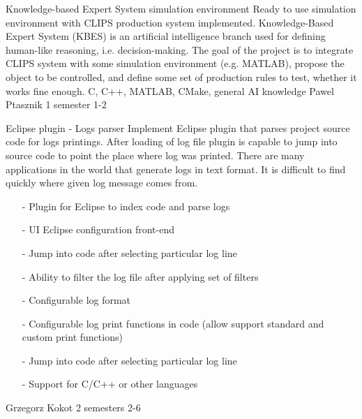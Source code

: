 \begin{project}
{Knowledge-based Expert System simulation environment}
{Ready to use simulation environment with CLIPS production system implemented.}
{
Knowledge-Based Expert System (KBES) is an artificial intelligence branch used for defining human-like reasoning, i.e. decision-making. The goal of the project is to integrate CLIPS system with some simulation environment (e.g. MATLAB), propose the object to be controlled, and define some set of production rules to test, whether it works fine enough. }
{C, C++, MATLAB, CMake, general AI knowledge}
{Pawel Ptasznik}
{1 semester}
{1-2}
\end{project}
\begin{project}
{Eclipse plugin - Logs parser}
{
Implement Eclipse plugin that parses project source code for logs printings.
After loading of log file plugin is capable to jump into source code to point
the place where log was printed.
There are many applications in the world that generate logs in text format. It is difficult to find quickly where given log message comes from. 
}
{
 \begin{itemize}
  \item[-] Plugin for Eclipse to index code and parse logs
  \item[-] UI Eclipse configuration front-end
  \item[-] Jump into code after selecting particular log line
  \item[-] Ability to filter the log file after applying set of filters
\end{itemize}
}
{
 \begin{itemize}
  \item[-] Configurable log format
  \item[-] Configurable log print functions in code (allow support standard and custom print functions)
  \item[-] Jump into code after selecting particular log line
  \item[-] Support for C/C++ or other languages
\end{itemize}
}
{Grzegorz Kokot}
{2 semesters}
{2-6}
\end{project}
